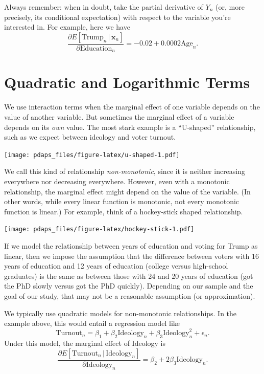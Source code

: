 \documentclass[
  12pt,
  oneside,openany]{book}
\begin{document}
Always remember: when in doubt, take the partial derivative of \(Y_n\) (or, more precisely, its conditional expectation) with respect to the variable you're interested in. For example, here we have
\[
\frac{\partial{}E[\text{Trump}_n \,|\, \mathbf{x}_n]}{\partial{}\text{Education}_n} = -0.02 + 0.0002 \text{Age}_n.
\]

\hypertarget{quadratic-and-logarithmic-terms}{%
\section{Quadratic and Logarithmic Terms}\label{quadratic-and-logarithmic-terms}}

We use interaction terms when the marginal effect of one variable depends on the value of another variable. But sometimes the marginal effect of a variable depends on its \emph{own} value. The most stark example is a ``U-shaped'' relationship, such as we expect between ideology and voter turnout.

\texttt{[image: pdaps\_files/figure-latex/u-shaped-1.pdf]}

We call this kind of relationship \emph{non-monotonic}, since it is neither increasing everywhere nor decreasing everywhere. However, even with a monotonic relationship, the marginal effect might depend on the value of the variable. (In other words, while every linear function is monotonic, not every monotonic function is linear.) For example, think of a hockey-stick shaped relationship.

\texttt{[image: pdaps\_files/figure-latex/hockey-stick-1.pdf]}

If we model the relationship between years of education and voting for Trump as linear, then we impose the assumption that the difference between voters with 16 years of education and 12 years of education (college versus high-school graduates) is the same as between those with 24 and 20 years of education (got the PhD slowly versus got the PhD quickly). Depending on our sample and the goal of our study, that may not be a reasonable assumption (or approximation).

We typically use quadratic models for non-monotonic relationships. In the example above, this would entail a regression model like
\[
\text{Turnout}_n = \beta_1 + \beta_2 \text{Ideology}_n + \beta_3 \text{Ideology}_n^2 + \epsilon_n.
\]
Under this model, the marginal effect of Ideology is
\[
\frac{\partial{}E[\text{Turnout}_n \,|\, \text{Ideology}_n]}{\partial{}\text{Ideology}_n}
= \beta_2 + 2 \beta_3 \text{Ideology}_n.
\]
\end{document}
